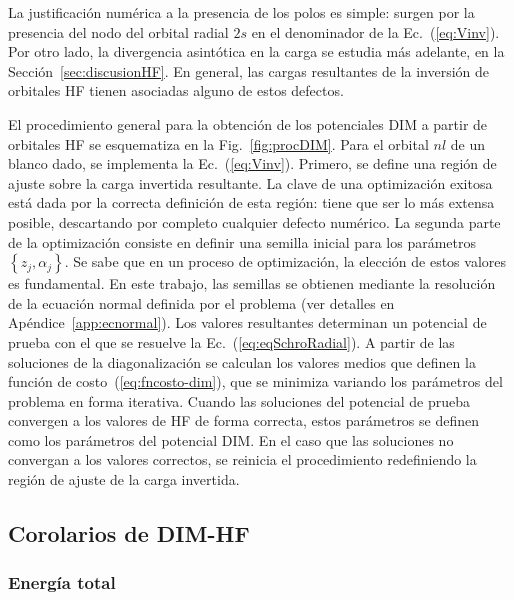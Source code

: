La justificación numérica a la presencia de los polos es simple: surgen 
por la presencia del nodo del orbital radial $2s$ en el denominador de 
la Ec.~(\ref{eq:Vinv}). Por otro lado, la divergencia asintótica en la 
carga se estudia más adelante, en la Sección~\ref{sec:discusionHF}. 
En general, las cargas resultantes de la inversión de orbitales HF 
tienen asociadas alguno de estos defectos. 

El procedimiento general para la obtención de los potenciales DIM a 
partir de orbitales HF se esquematiza en la Fig.~\ref{fig:procDIM}. Para 
el orbital $nl$ de un blanco dado, se implementa la Ec.~(\ref{eq:Vinv}). 
Primero, se define una región de ajuste sobre la carga invertida 
resultante. La clave de una optimización exitosa está dada por la 
correcta definición de esta región: tiene que ser lo más extensa 
posible, descartando por completo cualquier defecto numérico. La segunda 
parte de la optimización consiste en definir una semilla inicial para 
los parámetros $\left\{z_j,\alpha_j\right\}$. Se sabe que en un proceso 
de optimización, la elección de estos valores es fundamental. En este 
trabajo, las semillas se obtienen mediante la resolución de la ecuación 
normal definida por el problema (ver detalles en 
Apéndice~\ref{app:ecnormal}). Los valores resultantes determinan un 
potencial de prueba con el que se resuelve la 
Ec.~(\ref{eq:eqSchroRadial}). A partir de las soluciones de la 
diagonalización se calculan los valores medios que definen la función de 
costo~(\ref{eq:fncosto-dim}), que se minimiza variando los parámetros 
del problema en forma iterativa. Cuando las soluciones del potencial de 
prueba convergen a los valores de HF de forma correcta, estos parámetros 
se definen como los parámetros del potencial DIM. En el caso que las 
soluciones no convergan a los valores correctos, se reinicia el 
procedimiento redefiniendo la región de ajuste de la carga invertida.

\subsection{Corolarios de DIM-HF}
\label{sec:corolarios}

\subsubsection*{Energía total}

